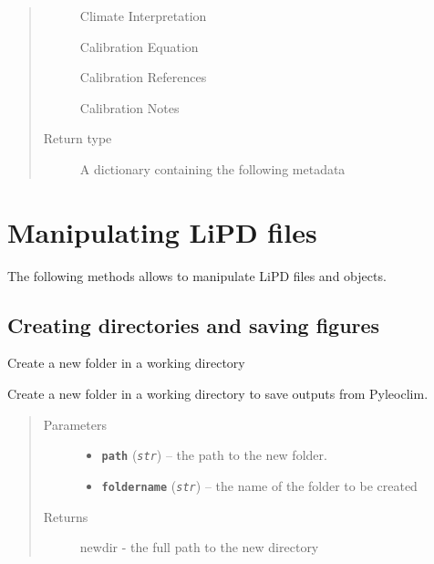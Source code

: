 \documentclass[letterpaper,10pt,english]{sphinxmanual}
\begin{document}
\begin{fulllineitems}
\begin{fulllineitems}
\begin{quote}
\begin{description}
Climate Interpretation

Calibration Equation

Calibration References

Calibration Notes


\item[{Return type}] \leavevmode
A dictionary containing the following metadata

\end{description}\end{quote}

\end{fulllineitems}


\end{fulllineitems}



\chapter{Manipulating LiPD files}
\label{LIPDutils::doc}\label{LIPDutils:manipulating-lipd-files}
The following methods allows to manipulate LiPD files and objects.


\section{Creating directories and saving figures}
\label{LIPDutils:creating-directories-and-saving-figures}

\begin{fulllineitems}
\label{LIPDutils:pyleoclim.createdir}
Create a new folder in a working directory

Create a new folder in a working directory to save outputs from Pyleoclim.
\begin{quote}\begin{description}
\item[{Parameters}] \leavevmode\begin{itemize}
\item {} 
\textbf{\texttt{path}} (\emph{\texttt{str}}) -- the path to the new folder.

\item {} 
\textbf{\texttt{foldername}} (\emph{\texttt{str}}) -- the name of the folder to be created

\end{itemize}

\item[{Returns}] \leavevmode
newdir - the full path to the new directory

\end{description}\end{quote}

\end{fulllineitems}
\end{document}
